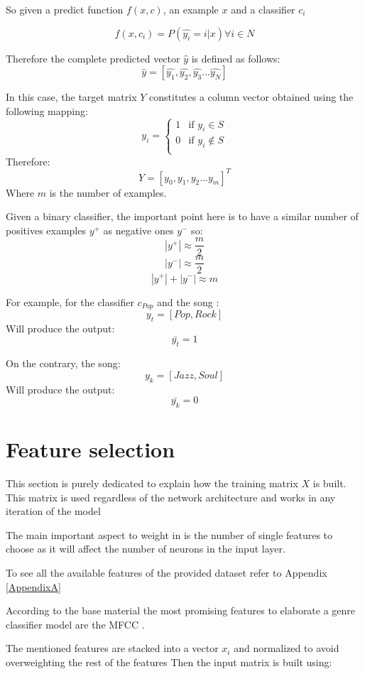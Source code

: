 So given a predict function  $f(x, c)$, an example $x$ and a classifier $c_i$ 

$$ f(x, c_i) =  P(\hat{y_i} = i | x) \forall i \in N $$

Therefore the complete predicted vector $\hat{y}$ is defined as follows:
$$ \hat{y} = [ \hat{y_1}, \hat{y_2}, \hat{y_3} ... \hat{y_N} ] $$

In this case, the target matrix \(Y\) constitutes a column vector obtained using the following mapping:
$$ {y_i} =
\begin{cases}
    1 & \text{if } y_i \in S\\
    0 & \text{if } y_i \notin S\\
\end{cases}
$$
Therefore:
$$ Y = [y_0, y_1, y_2 ... y_m]^T $$
Where $m$ is the number of examples.

Given a binary classifier, the important point here is to have a similar number of positives examples $y^+$ as negative ones $y^-$ so:
$$ |y^+|  \approx \frac{m}{2} $$
$$ |y^-|  \approx \frac{m}{2} $$
$$ |y^+| + |y^-| \approx m $$

For example, for the classifier $c_{Pop}$ and the song :
$$ y_t  = [ Pop, Rock ] $$
Will produce the output:
$$ \bar{y_t}  = 1 $$

On the contrary, the song:
$$ y_k  = [ Jazz, Soul ] $$
Will produce the output:
$$ \bar{y_k}  = 0 $$

\newpage

\section{Feature selection}
\label{feature selection}

This section is purely dedicated to explain how the training matrix $X$ is built.
This matrix is used regardless of the network architecture and works in any iteration of the model

The main important aspect to weight in is the number of single features to choose as it will affect the number of neurons in the input layer.

To see all the available features of the provided dataset refer to Appendix \ref{AppendixA}

According to the base material the most promising features to elaborate a genre classifier model are the MFCC \cite{Jensen2006} \cite{Li2011}.

The mentioned features are stacked into a vector $x_i$ and normalized to avoid overweighting the rest of the features 
Then the input matrix is built using:

